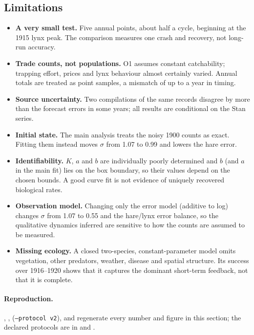 \subsection{Limitations}\label{sec:advay-limits}

\begin{itemize}
\item \textbf{A very small test.} Five annual points, about half a cycle, beginning at the
1915 lynx peak. The comparison measures one crash and recovery, not long-run accuracy.
\item \textbf{Trade counts, not populations.} O1 assumes constant catchability; trapping
effort, prices and lynx behaviour almost certainly varied. Annual totals are treated as
point samples, a mismatch of up to a year in timing.
\item \textbf{Source uncertainty.} Two compilations of the same records disagree by more than
the forecast errors in some years; all results are conditional on the Stan series.
\item \textbf{Initial state.} The main analysis treats the noisy 1900 counts as exact. Fitting
them instead moves $\sigma$ from 1.07 to 0.99 and lowers the hare error.
\item \textbf{Identifiability.} $K$, $a$ and $b$ are individually poorly determined and $b$
(and $a$ in the main fit) lies on the box boundary, so their values depend on the chosen
bounds. A good curve fit is not evidence of uniquely recovered biological rates.
\item \textbf{Observation model.} Changing only the error model (additive to log) changes
$\sigma$ from 1.07 to 0.55 and the hare/lynx error balance, so the qualitative dynamics
inferred are sensitive to how the counts are assumed to be measured.
\item \textbf{Missing ecology.} A closed two-species, constant-parameter model omits
vegetation, other predators, weather, disease and spatial structure. Its success over
1916--1920 shows that it captures the dominant short-term feedback, not that it is complete.
\end{itemize}

\begin{sloppypar}
\paragraph{Reproduction.} ,
,  (\texttt{--protocol v2}),
 and  regenerate every
number and figure in this section; the declared protocols are in
 and .
\end{sloppypar}
